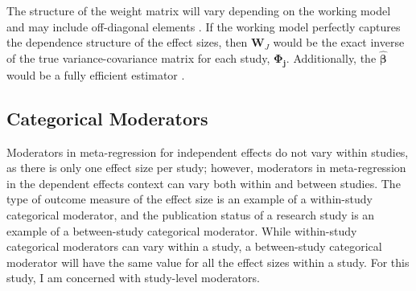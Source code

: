 The structure of the weight matrix will vary depending on the working model and may include off-diagonal elements \autocite{pustejovsky2022}. If the working model perfectly captures the dependence structure of the effect sizes, then $ \mathbf{W}_J$ would be the exact inverse of the true variance-covariance matrix for each study, $\mathbf{\Phi_j}$. Additionally, the $\bm{\hat{\beta}}$ would be a fully efficient estimator \autocite{pustejovsky2022}.  



\subsection{Categorical Moderators} 

Moderators in meta-regression for independent effects do not vary within studies, as there is only one effect size per study; however, moderators in meta-regression in the dependent effects context can vary both within and between studies. The type of outcome measure of the effect size is an example of a within-study categorical moderator, and the publication status of a research study is an example of a between-study categorical moderator. While within-study categorical moderators can vary within a study, a between-study categorical moderator will have the same value for all the effect sizes within a study. For this study, I am concerned with study-level moderators. 

